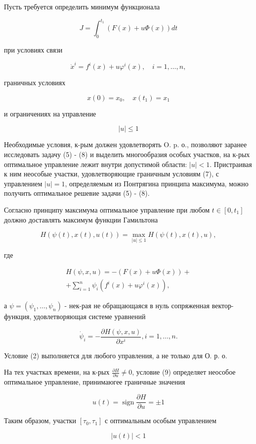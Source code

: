 \documentclass[10pt]{article}
\begin{document}
Пусть требуется определить минимум функционала

\[
J=\int_{0}^{t_{1}}(F(x)+u \Phi(x)) d t
\]

при условиях связи

\[
\dot{x}^{i}=f^{i}(x)+u \varphi^{i}(x), \quad i=1, \ldots, n,
\]

граничных условиях

\[
x(0)=x_{0}, \quad x\left(t_{1}\right)=x_{1}
\]

и ограничениях на управление

\[
|u| \leqslant 1
\]

Необходимые условия, к-рым должен удовлетворять O. p. о., позволяют заранее исследовать задачу (5) - (8) и выделить многообразия особых участков, на к-рых оптимальное управление лежит внутри допустимой области: $|u|<1$. Пристраивая к ним неособые участки, удовлетворяющие граничным условиям (7), с управлением $|u|=1$, определяемым из Понтрягина принципа максимума, можно получить оптимальное решевие задачи (5) - (8).

Согласно принципу максимума оптимальное управление при любом $t \in\left[0, t_{1}\right]$ должно доставлять максимум функции Гамильтона

\[
H(\psi(t), x(t), u(t))=\max _{|u| \leqslant 1} H(\psi(t), x(t), u),
\]

где

\[
\begin{gathered}
H(\psi, x, u)=-(F(x)+u \Phi(x))+ \\
+\sum_{i=1}^{n} \psi_{i}\left(f^{i}(x)+u \varphi^{i}(x)\right),
\end{gathered}
\]

а $\psi=\left(\psi_{1}, \ldots, \psi_{n}\right)$ - нек-рая не обращающаяся в нуль сопряженная вектор-функция, удовлетворяющая системе уравнений

\[
\dot{\psi}_{i}=-\frac{\partial H(\psi, x, u)}{\partial x^{i}}, i=1, \ldots, n .
\]

Условие (2) выполняется для любого управления, а не только для О. р. о.

На тех участках времени, на к-рых $\frac{\partial H}{\partial u} \neq 0$, условие (9) определяет неособое оптимальное управление, принимаюгее граничные значения

\[
u(t)=\operatorname{sign} \frac{\partial H}{\partial u}= \pm 1
\]

Таким образом, участки $\left[\tau_{0}, \tau_{1}\right]$ с оптимальным особым управлением

\[
|u(t)|<1
\]
\end{document}
